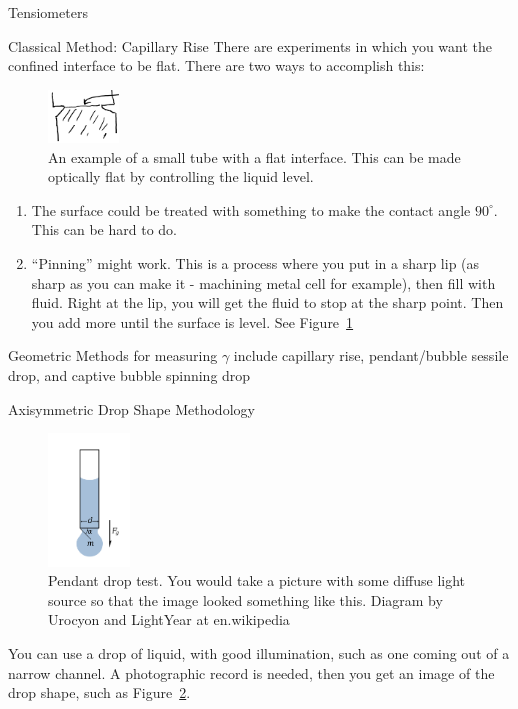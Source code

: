 \documentclass{article}
\begin{document}
\begin{section}{Tensiometers}
\begin{subsection}{Classical Method: Capillary Rise}
There are experiments in which you want the confined interface to be flat. There are two ways to accomplish this:
\begin{figure}[h]
	\centering
	\includegraphics[height=40pt]{sharpInterface}
	\caption{An example of a small tube with a flat interface. This can be made optically flat by controlling the liquid level.}
	\label{fig:sharpInterface}
\end{figure}
\begin{enumerate}
	\item The surface could be treated with something to make the contact angle $90^\circ$. This can be hard to do.
	\item ``Pinning'' might work. This is a process where you put in a sharp lip (as sharp as you can make it - machining metal cell for example), then fill with fluid. Right at the lip, you will get the fluid to stop at the sharp point. Then you add more until the surface is level. See Figure~\ref{fig:sharpInterface}

\end{enumerate}
Geometric Methods for measuring $\gamma$ include
	capillary rise,
	pendant/bubble sessile drop, and
	captive bubble spinning drop
\end{subsection}
\begin{subsection}{Axisymmetric Drop Shape Methodology}

	\begin{figure}[h]
		\centering
		\includegraphics[height=100pt]{pendantDrop}
		\caption{Pendant drop test. You would take a picture with some diffuse light source so that the image looked something like this. Diagram by Urocyon and LightYear at en.wikipedia} 
		\label{fig:pendant drop}
	\end{figure}
	You can use a drop of liquid, with good illumination, such as one coming out of a narrow channel. A photographic record is needed, then you get an image of the drop shape, such as Figure~\ref{fig:pendant drop}. 


\end{subsection}
\end{section}
\end{document}
